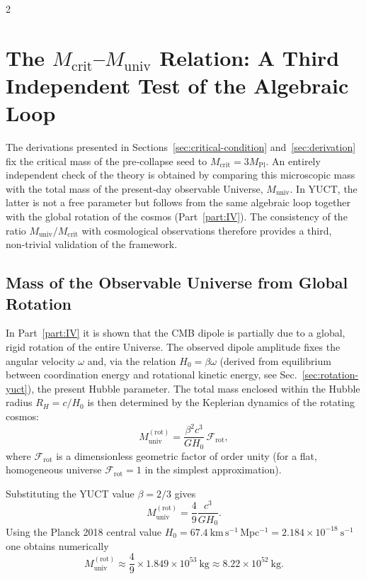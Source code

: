 \documentclass[12pt,a4paper]{article}
\begin{document}
	\begin{multicols}{2}
		
		\section{The \(M_{\mathrm{crit}}\)–\(M_{\mathrm{univ}}\) Relation: A Third Independent Test of the Algebraic Loop}
		\label{sec:third-test}
		
		The derivations presented in Sections~\ref{sec:critical-condition} and~\ref{sec:derivation} fix the critical mass of the pre‑collapse seed to \(M_{\mathrm{crit}} = 3 M_{\mathrm{Pl}}\). An entirely independent check of the theory is obtained by comparing this microscopic mass with the total mass of the present‑day observable Universe, \(M_{\mathrm{univ}}\). In YUCT, the latter is not a free parameter but follows from the same algebraic loop together with the global rotation of the cosmos (Part~\ref{part:IV}). The consistency of the ratio \(M_{\mathrm{univ}} / M_{\mathrm{crit}}\) with cosmological observations therefore provides a third, non‑trivial validation of the framework.
		
		\subsection{Mass of the Observable Universe from Global Rotation}
		
		In Part~\ref{part:IV} it is shown that the CMB dipole is partially due to a global, rigid rotation of the entire Universe. The observed dipole amplitude fixes the angular velocity \(\omega\) and, via the relation \(H_0 = \beta \omega\) (derived from equilibrium between coordination energy and rotational kinetic energy, see Sec.~\ref{sec:rotation-yuct}), the present Hubble parameter. The total mass enclosed within the Hubble radius \(R_H = c / H_0\) is then determined by the Keplerian dynamics of the rotating cosmos:
		\begin{equation}
			M_{\mathrm{univ}}^{\mathrm{(rot)}} = \frac{\beta^2 c^3}{G H_0} \, \mathcal{F}_{\mathrm{rot}},
			\label{eq:muniv-rot}
		\end{equation}
		where \(\mathcal{F}_{\mathrm{rot}}\) is a dimensionless geometric factor of order unity (for a flat, homogeneous universe \(\mathcal{F}_{\mathrm{rot}} = 1\) in the simplest approximation).
		
		Substituting the YUCT value \(\beta = 2/3\) gives
		\begin{equation}
			M_{\mathrm{univ}}^{\mathrm{(rot)}} = \frac{4}{9} \frac{c^3}{G H_0}.
			\label{eq:muniv-rot-beta}
		\end{equation}
		Using the Planck 2018 central value \(H_0 = 67.4\ \mathrm{km\,s^{-1}\,Mpc^{-1}} = 2.184\times 10^{-18}\ \mathrm{s^{-1}}\) one obtains numerically
		\[
		M_{\mathrm{univ}}^{\mathrm{(rot)}} \approx \frac{4}{9} \times 1.849\times 10^{53}\ \mathrm{kg} \approx 8.22\times 10^{52}\ \mathrm{kg}.
		\]
		

\end{multicols}
\end{document}
